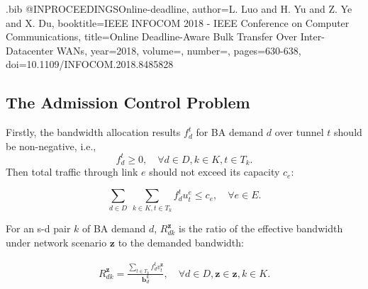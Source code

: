 \documentclass[sigconf]{acmart}
\begin{document}
\begin{filecontents}{\jobname.bib}
@INPROCEEDINGS{Online-deadline,
  author={L. {Luo} and H. {Yu} and Z. {Ye} and X. {Du}},
  booktitle={IEEE INFOCOM 2018 - IEEE Conference on Computer Communications}, 
  title={Online Deadline-Aware Bulk Transfer Over Inter-Datacenter WANs}, 
  year={2018},
  volume={},
  number={},
  pages={630-638},
  doi={10.1109/INFOCOM.2018.8485828}}
  



 \end{filecontents}
 



\clearpage

\begin{appendices}
 \section{The Admission Control Problem} \label{admission_problem}
 
Firstly, the bandwidth allocation results $f_{d}^t$ for BA demand $d$ over tunnel $t$ should be non-negative, i.e.,
\begin{equation}
f_{d}^t \ge 0, \quad\forall d \in D ,  k\in K,  t\in T_{k}.
\label{constraint-f}
\end{equation}
Then total traffic through link $e$ should not exceed its capacity $c_e$:

\begin{equation}
 \sum_{d \in D}\ \sum_{k\in K, t\in T_{k}}f_{d}^tu_t^e \le c_e, \quad \forall e \in E.
\label{constraint-e}
\end{equation}


For an s-d pair $k$ of BA demand $d$, $R_{dk}^{\mathbf{z}}$ is the ratio of the effective bandwidth under network scenario $\mathbf{z}$ to the demanded bandwidth:

 \begin{eqnarray} \label{R}
R_{dk}^{\mathbf{z}}=\frac{\sum_{t\in T_{k}}f_{d}^tv_t^{\mathbf{z}} }{\mathbf{b}^k_d}, \quad \forall  d \in D, \mathbf{z}\in \mathbf{z}, k \in K.
\end{eqnarray}


\end{appendices}
\end{document}
